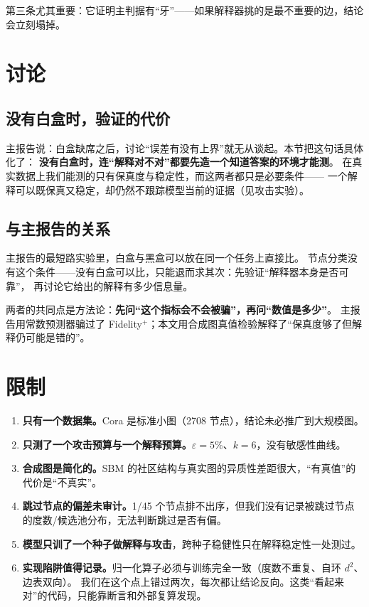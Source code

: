 \documentclass[a4paper,10pt]{article}
\begin{document}
第三条尤其重要：它证明主判据有“牙”——如果解释器挑的是最不重要的边，结论会立刻塌掉。

\section{讨论}

\subsection{没有白盒时，验证的代价}

主报告说：白盒缺席之后，讨论“误差有没有上界”就无从谈起。本节把这句话具体化了：
\textbf{没有白盒时，连“解释对不对”都要先造一个知道答案的环境才能测}。
在真实数据上我们能测的只有保真度与稳定性，而这两者都只是必要条件——
一个解释可以既保真又稳定，却仍然不跟踪模型当前的证据（见攻击实验）。

\subsection{与主报告的关系}

主报告的最短路实验里，白盒与黑盒可以放在同一个任务上直接比。
节点分类没有这个条件——没有白盒可以比，只能退而求其次：先验证“解释器本身是否可靠”，
再讨论它给出的解释有多少信息量。

两者的共同点是方法论：\textbf{先问“这个指标会不会被骗”，再问“数值是多少”}。
主报告用常数预测器骗过了 Fidelity$^+$；本文用合成图真值检验解释了“保真度够了但解释仍可能是错的”。

\section{限制}

\begin{enumerate}[leftmargin=1.6em]
\item \textbf{只有一个数据集。}Cora 是标准小图（2708 节点），结论未必推广到大规模图。
\item \textbf{只测了一个攻击预算与一个解释预算。}$\varepsilon=5\%$、$k=6$，没有敏感性曲线。
\item \textbf{合成图是简化的。}SBM 的社区结构与真实图的异质性差距很大，“有真值”的代价是“不真实”。
\item \textbf{跳过节点的偏差未审计。}1/45 个节点排不出序，但我们没有记录被跳过节点的度数/候选池分布，无法判断跳过是否有偏。
\item \textbf{模型只训了一个种子做解释与攻击}，跨种子稳健性只在解释稳定性一处测过。
\item \textbf{实现陷阱值得记录。}归一化算子必须与训练完全一致（度数不重复、自环 $d^2$、边表双向）。
我们在这个点上错过两次，每次都让结论反向。这类“看起来对”的代码，只能靠断言和外部复算发现。
\end{enumerate}
\end{document}
